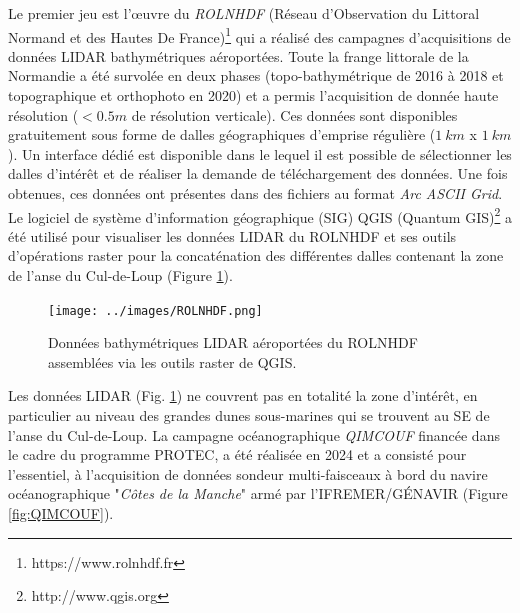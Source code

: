 \documentclass[10pt,a4paper,titlepage]{article}
\begin{document}
Le premier jeu est l'\oe{}uvre du \textit{ROLNHDF} (Réseau d'Observation du Littoral Normand et des Hautes De France)\footnote{https://www.rolnhdf.fr} qui a réalisé des campagnes d'acquisitions de données LIDAR bathymétriques aéroportées. Toute la frange littorale de la Normandie a été survolée en deux phases (topo-bathymétrique de 2016 à 2018 et topographique et orthophoto en 2020) et a permis l'acquisition de donnée haute résolution ($<0.5 m$ de résolution verticale). Ces données sont disponibles gratuitement sous forme de dalles géographiques d'emprise régulière ($1~km$ x $1~km$). Un interface dédié est disponible dans le lequel il est possible de sélectionner les dalles d'intérêt et de réaliser la demande de téléchargement des données. Une fois obtenues, ces données ont présentes dans des fichiers au format \textit{Arc ASCII Grid}. Le logiciel de système d'information géographique (SIG) QGIS (Quantum GIS)\footnote{http://www.qgis.org} a été utilisé pour visualiser les données LIDAR du ROLNHDF et ses outils d'opérations raster pour la concaténation des différentes dalles contenant la zone de l'anse du Cul-de-Loup (Figure \ref{fig:ROLNHDF}).

\begin{figure}[H]
    \centering
    \texttt{[image: ../images/ROLNHDF.png]}
    \caption{Données bathymétriques LIDAR aéroportées du ROLNHDF assemblées via les outils raster de QGIS.}
    \label{fig:ROLNHDF}
\end{figure}

Les données LIDAR (Fig. \ref{fig:ROLNHDF}) ne couvrent pas en totalité la zone d'intérêt, en particulier au niveau des grandes dunes sous-marines qui se trouvent au SE de l'anse du Cul-de-Loup. La campagne océanographique \textit{QIMCOUF} financée dans le cadre du programme PROTEC, a été réalisée en 2024 et a consisté pour l'essentiel, à l'acquisition de données sondeur multi-faisceaux à bord du navire océanographique "\textit{Côtes de la Manche}" armé par l'IFREMER/GÉNAVIR (Figure \ref{fig:QIMCOUF}).
\end{document}
